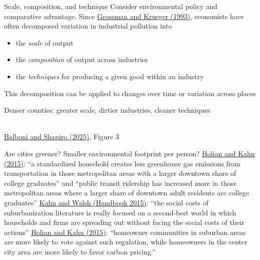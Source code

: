 \documentclass[11pt,notes=hide,aspectratio=169]{beamer}
\begin{document}
\begin{frame}{Scale, composition, and technique}
Consider environmental policy and comparative advantage.
Since \href{https://www.nber.org/papers/w3914}{Grossman and Krueger (1993)}, economists have often decomposed variation in industrial pollution into
\begin{itemize}
\item the \textit{scale} of output
\item the \textit{composition} of output across industries
\item the \textit{techniques} for producing a given good within an industry
\end{itemize}
This decomposition can be applied to changes over time or variation across places
\end{frame}
\begin{frame}{Denser counties: greater scale, dirtier industries, cleaner techniques}
\begin{center}
\\{\scriptsize \href{https://www.nber.org/papers/w33377}{Balboni and Shapiro (2025)}, Figure 3}
\end{center}
\begin{itemize}
\end{itemize}
\end{frame}
\begin{frame}{Are cities greener? Smaller environmental footprint per person?}
\href{https://doi.org/10.1016/j.ecolecon.2015.05.012}{Holian and Kahn (2015)}:
``a standardized household creates less greenhouse gas emissions from transportation in those metropolitan areas with a larger downtown share of college graduates''
and
``public transit ridership has increased more in those metropolitan areas where a larger share of downtown adult residents are college graduates''
\smallskip
\href{https://doi.org/10.1016/B978-0-444-59517-1.00007-6}{Kahn and Walsh (Handbook 2015)}:
``the social costs of suburbanization literature is really focused on a second-best world in which households and firms are spreading out without facing the social costs of their actions''
\smallskip
\href{https://www.journals.uchicago.edu/doi/abs/10.1086/680663}{Holian and Kahn (2015)}:
``homeowner communities in suburban areas are more likely to vote against such regulation, while homeowners in the center city area are more likely to favor carbon pricing.''
\end{frame}
\end{document}
